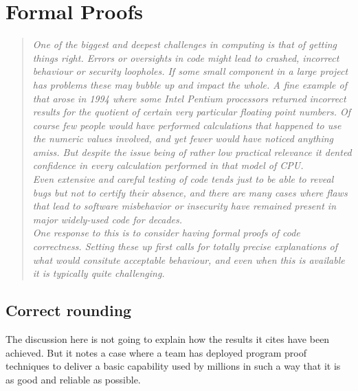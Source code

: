 \section{Formal Proofs}
\begin{quotation}\textit{
One of the biggest and deepest challenges in computing is that of
getting things right. Errors or oversights in code might lead to
crashed, incorrect behaviour or security loopholes. If some small
component in a large project has problems these may bubble up and
impact the whole. A fine example of that arose in 1994 where some
Intel Pentium processors returned incorrect results for the quotient
of certain very particular floating point numbers. Of course few people
would have performed calculations that happened to use the numeric
values involved, and yet fewer would have noticed anything amiss. But
despite the issue being of rather low practical relevance it dented
confidence in every calculation performed in that model of CPU. \\
Even extensive and careful testing of code tends just to be able to
reveal bugs but not to certify their absence, and there are many cases
where flaws that lead to software misbehavior or insecurity have remained
present in major widely-used code for decades.\\
One response to this is to consider having formal proofs of code
correctness. Setting these up first calls for totally precise explanations
of what would consitute acceptable behaviour, and even when this is
available it is typically quite challenging.
}\end{quotation}


\subsection{Correct rounding}
The discussion here is not going to explain how the results it cites have
been achieved. But it notes a case where a team has deployed program proof
techniques to deliver a basic capability used by millions in such a way
that it is as good and reliable as possible.


